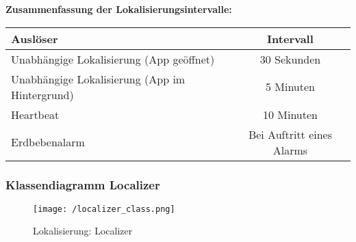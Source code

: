 \textbf{Zusammenfassung der Lokalisierungsintervalle:}
\\
\begin{center}
\begin{tabular}{ | l | c |}
	\hline
	\textbf{Auslöser} & \textbf{Intervall}\\    
	\hline
	Unabhängige Lokalisierung (App geöffnet) & 30 Sekunden\\    
    \hline
	Unabhängige Lokalisierung (App im Hintergrund) & 5 Minuten\\
	\hline	
	Heartbeat & 10 Minuten\\
	\hline	
	Erdbebenalarm & Bei Auftritt eines Alarms\\
	\hline
\end{tabular}
\end{center}
\bigskip
\subsubsection{Klassendiagramm Localizer}
\begin{figure}[H]
	\centering
	\texttt{[image: /localizer\_class.png]}
	\caption{Lokalisierung: Localizer}
	\label{fig:localizerClass}
\end{figure}